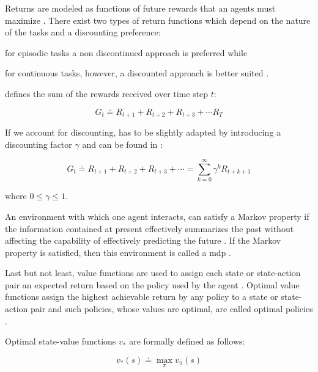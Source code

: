 \documentclass{seal_thesis}
\begin{document}
Returns are modeled as functions of future rewards that an agents must maximize \cite[p. 73]{Sutton2017}. There exist two types of return functions which depend on the nature of the tasks and a discounting preference:
\begin{enumerate*}
	\item for episodic tasks a non discontinued approach is preferred while
	\item for continuous tasks, however, a discounted approach is better suited \cite[p. 73]{Sutton2017}.
\end{enumerate*}

 defines the sum of the rewards received over time step $t$:

\begin{equation}
\label{eq:expected_return}
	G_t  \doteq R_{t+1} + R_{t+2} + R_{t+3} + \cdots R_{T}
\end{equation}

If we account for discounting,  has to be slightly adapted by introducing a discounting factor $\gamma$ and can be found in :

\begin{equation}
\label{eq:expected_discounted_return}
	G_t  \doteq R_{t+1} + R_{t+2} + R_{t+3} + \cdots = \sum_{k=0}^\infty \gamma^k R_{t+k+1}
\end{equation}

where $0 \leq \gamma \leq 1$.

An environment  with which one agent interacts, can satisfy a Markov property if the information contained at present effectively summarizes the past without affecting the capability of effectively predicting the future \cite[p. 73]{Sutton2017}. If the Markov property is satisfied, then this environment is called a \gls{mdp} \cite[p. 73]{Sutton2017}.

Last but not least, value functions are used to assign each state or state-action pair an expected return based on the policy used by the agent \cite[p. 74]{Sutton2017}. Optimal value functions assign the highest achievable return by any policy to a state or state-action pair  and such policies, whose values are optimal, are called optimal policies \cite[p. 74]{Sutton2017}.

Optimal state-value functions $v_*$ are formally defined as follows:

\begin{equation}
	v_* (s) \doteq \max_\pi v_\pi (s)
\end{equation}
\end{document}
